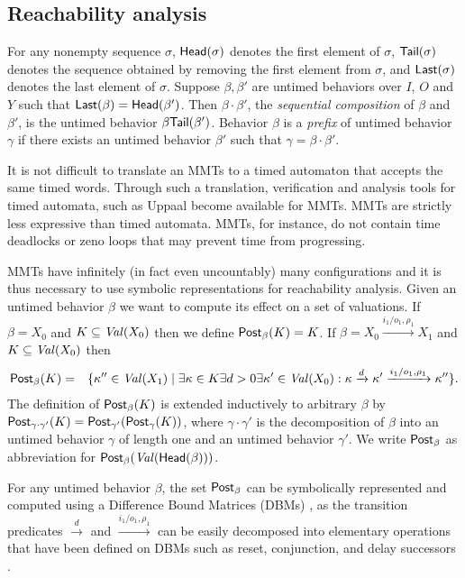 \subsection{Reachability analysis}
For any nonempty sequence $\sigma$, $\mathsf{Head}({\sigma})$ denotes the first element of $\sigma$, $\mathsf{Tail}({\sigma})$ denotes the sequence obtained by removing the first element from $\sigma$, and $\mathsf{Last}({\sigma})$ denotes the last element of $\sigma$.
Suppose $\beta, \beta'$ are untimed behaviors over $I$, $O$ and $Y$ such that $\mathsf{Last}({\beta}) = \mathsf{Head}({\beta'})$.
Then $\beta \cdot \beta'$, the \emph{sequential composition} of $\beta$ and $\beta'$, is the untimed behavior $\beta \mathsf{Tail}({\beta'})$.
Behavior $\beta$ is a \emph{prefix} of untimed behavior $\gamma$ if there exists an untimed behavior $\beta'$ such that $\gamma = \beta \cdot \beta'$.

It is not difficult to translate an MMTs to a timed automaton \cite{AD94,BengtssonY03} that accepts the same timed words.
Through such a translation, verification and analysis tools for timed automata, such as Uppaal \cite{Uppaal4.0}
become available for MMTs.
MMTs are strictly less expressive than timed automata. MMTs, for instance, do not contain time deadlocks or zeno loops that
may prevent time from progressing.

MMTs have infinitely (in fact even uncountably) many configurations and it is thus necessary to use symbolic representations
for reachability analysis. Given an untimed behavior $\beta$ we want to compute its effect on a set of valuations. 
If $\beta =X_0$ and $K \subseteq\mathit{Val}({X_0})$ then we define $\mathsf{Post}_{\beta}(K) = K$.
If $\beta = X_0 \xrightarrow{i_1/o_1, \rho_1} X_1$ and
$K \subseteq\mathit{Val}({X_0})$ then
\begin{eqnarray*}
\mathsf{Post}_{\beta}(K) & = & \{ \kappa'' \in\mathit{Val}({X_1}) \mid \exists \kappa \in K \exists d >0 \exists \kappa' \in\mathit{Val}({X_0}) :
 \kappa \xrightarrow{d} \kappa' \xrightarrow{i_1/o_1, \rho_1} \kappa'' \}.
\end{eqnarray*}
The definition of $\mathsf{Post}_{\beta}(K)$ is extended inductively to arbitrary $\beta$ by 
$\mathsf{Post}_{\gamma \cdot \gamma'}(K) = \mathsf{Post}_{\gamma'} (\mathsf{Post}_{\gamma}(K))$, where $\gamma \cdot \gamma'$ is the decomposition of
$\beta$ into an untimed behavior $\gamma$ of length one and an untimed behavior $\gamma'$.
We write $\mathsf{Post}_{\beta}$ as abbreviation for $\mathsf{Post}_{\beta}(\mathit{Val}({\mathsf{Head}({\beta})}))$.

For any untimed behavior $\beta$, the set $\mathsf{Post}_{\beta}$ can be symbolically represented and computed using a Difference Bound Matrices (DBMs)
 \cite{Di89},  as the transition predicates $\xrightarrow{d}$ and $\xrightarrow{i_1/o_1, \rho_1}$ can be easily decomposed 
into elementary operations that have been defined
on DBMs such as reset, conjunction, and delay successors \cite{BengtssonY03}.

